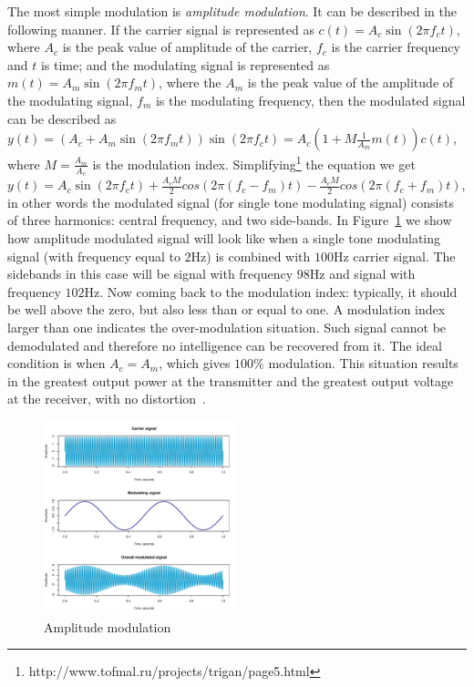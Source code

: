 The most simple modulation is \textit{amplitude modulation}. It can be 
described in the following manner. If the carrier
signal is represented as $c(t) = A_c\sin(2\pi f_ct)$, where $A_c$ is the 
peak value of amplitude of the carrier, $f_c$ is the carrier
frequency and $t$ is time; and the modulating signal is represented
as $m(t)=A_m\sin(2\pi f_mt)$, where the $A_m$ is the peak value of the amplitude of the 
modulating signal, $f_m$ is the modulating frequency, then
the modulated signal can be described as  
$y(t) = (A_c + A_m \sin(2\pi f_mt))\sin(2\pi f_ct) = A_c(1+M \frac{1}{A_m}m(t))c(t)$, 
where $M= \frac{A_m}{A_c}$ is the modulation index.
Simplifying\footnote{http://www.tofmal.ru/projects/trigan/page5.html} the equation 
we get $y(t) = A_c\sin(2\pi f_ct) + \frac{A_cM}{2}cos(2\pi(f_c-f_m)t) - 
\frac{A_cM}{2}cos(2\pi(f_c+f_m)t)$, in other words the modulated signal 
(for single tone modulating signal) consists of three harmonics: 
central frequency, and two side-bands. In Figure~\ref{fig:am} we show how 
amplitude modulated signal will look like when a single tone modulating signal 
(with frequency equal to $2$Hz) is combined with $100$Hz carrier signal. 
The sidebands in this case will be signal with frequency $98$Hz and 
signal with frequency $102$Hz.
Now coming back to the modulation index: typically, it should be 
well above the zero, but also less than or equal to one. A modulation index larger than one indicates 
the over-modulation situation. Such signal cannot be demodulated and therefore no
intelligence can be recovered from it. The ideal condition is when $A_c = A_m$, which gives $100\%$ modulation. 
This situation results in the greatest output power at the transmitter and the greatest output
voltage at the receiver, with no distortion~\cite{}. 

\begin{figure}[ht]
\includegraphics[width=0.5\textwidth]{graphics/microbanchmarking/amplitude_modulation.pdf}
\caption{Amplitude modulation}
\label{fig:am}
\end{figure}

